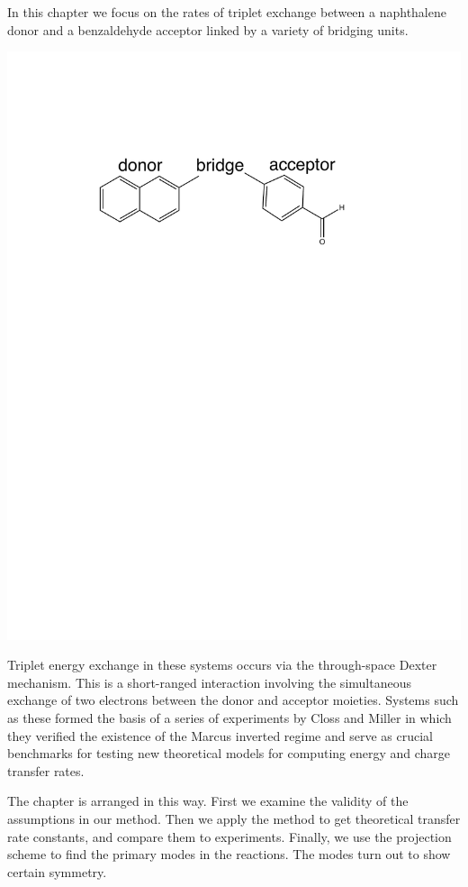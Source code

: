 In this chapter we focus on the rates of triplet exchange between a naphthalene donor and a benzaldehyde acceptor linked by a variety of bridging units.
\begin{center}
\includegraphics[width=0.50\columnwidth]{Chapters/chap2/Scheme1}
\end{center}
Triplet energy exchange in these systems occurs via the through-space Dexter mechanism\cite{dexter1953theory}.
This is a short-ranged interaction involving the simultaneous exchange of two electrons between the
donor and acceptor moieties.
Systems such as these formed the basis of a series of experiments by  Closs and Miller\cite{miller1984intramolecular}
in which they verified the existence of the Marcus inverted regime
and serve as crucial benchmarks for testing new theoretical models for computing
energy and charge transfer rates\cite{subotnik2008constructing,subotnik2009initial,subotnik2010predicting}.

The chapter is arranged in this way. First we examine the validity of the assumptions in our method. Then we apply the method to get theoretical transfer rate constants, and compare them to experiments. Finally, we use the projection scheme to find the primary modes in the reactions. The modes turn out to show certain symmetry.


